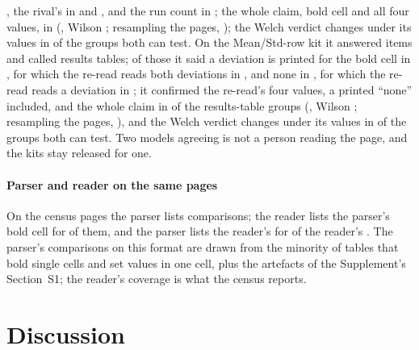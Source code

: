 \documentclass[preprint,review,12pt]{elsarticle}
\begin{document}
\nHmsWinnerDispFrac{}, the rival's in \nHmsRunnerMeanFrac{} and \nHmsRunnerDispFrac{}, and the run count in \nHmsNRunsFrac{}; the whole claim, bold cell and all four values, in \nHmsClaimFrac{} (\nHmsClaimPct{}, Wilson \nHmsClaimCi{}; resampling the \nHmsPages{} pages, \nHmsClaimPageCi{}); the Welch verdict changes under its values in \nHmsVerdictFlipsFrac{} of the groups both can test. On the Mean/Std-row kit it answered \nHrsLabelled{} items and called \nHrsResultsTableFrac{} results tables; of those it said a deviation is printed for the bold cell in \nHrsStdPrintedY{}, for which the re-read reads both deviations in \nHrsReaderRecallFrac{}, and none in \nHrsStdPrintedN{}, for which the re-read reads a deviation in \nHrsReaderFalseBarFrac{}; it confirmed the re-read's four values, a printed ``none'' included, and the whole claim in \nHrsClaimFrac{} of the results-table groups (\nHrsClaimPct{}, Wilson \nHrsClaimCi{}; resampling the \nHrsPages{} pages, \nHrsClaimPageCi{}), and the Welch verdict changes under its values in \nHrsVerdictFlipsFrac{} of the groups both can test. Two models agreeing is not a person reading the page, and the kits stay released for one. 

\paragraph{Parser and reader on the same pages} On the census pages the parser lists \nCzPipeGroups{} comparisons; the reader lists the parser's bold cell for \nCzPipeFoundPct{} of them, and the parser lists the reader's for \nCzReaderFoundPct{} of the reader's \nCzGroups{}. The parser's comparisons on this format are drawn from the minority of tables that bold single cells and set values in one cell, plus the artefacts of the Supplement's Section~S1; the reader's coverage is what the census reports.

\section{Discussion}
\label{sec:discussion}
\end{document}
